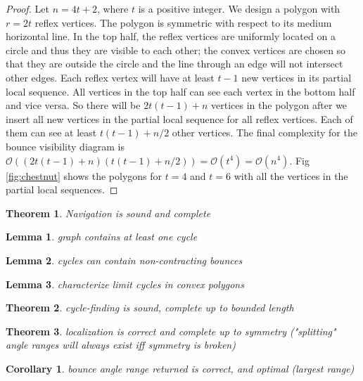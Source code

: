 \documentclass[]{article}  %
\newtheorem{theorem}{\bf Theorem}
\newtheorem{corollary}{\bf Corollary}
\newtheorem{lemma}{\bf Lemma}
\begin{document}
\begin{proof}
Let $n = 4t+2$, where $t$ is a positive integer. We design a polygon with
$r = 2t$ reflex vertices. The polygon is symmetric with respect to its medium
horizontal line. In the top half, the reflex vertices are uniformly located on a
circle and thus they are visible to each other; the convex vertices are chosen
so that they are outside the circle and the line through an edge will not
intersect other edges. Each reflex vertex will have at least $t-1$ new
vertices in its partial local sequence. All vertices in the top half can see
each vertex in the bottom half and vice versa. So there will be $2t(t-1)+n$
vertices in the polygon after we insert all new vertices in the partial local
sequence for all reflex vertices. Each of them can see at least $t(t-1)+n/2$
other vertices. The final complexity for the bounce visibility diagram is
$\mathcal{O} ((2t(t-1)+n)(t(t-1)+n/2)) = \mathcal{O}(t^4) = \mathcal{O}(n^4)$.
Fig \ref{fig:chestnut} shows the polygons for $t = 4$ and $t=6$ with all the
vertices in the partial local sequences. %

\end{proof}

\begin{theorem}
Navigation is sound and complete
\end{theorem}


\begin{lemma}
graph contains at least one cycle
\end{lemma}

\begin{lemma}
cycles can contain non-contracting bounces
\end{lemma}

\begin{lemma}
characterize limit cycles in convex polygons
\end{lemma}

\begin{theorem}
cycle-finding is sound, complete up to bounded length
\end{theorem}

\begin{theorem}
localization is correct and complete up to symmetry ("splitting" angle ranges
will always exist iff symmetry is broken)
\end{theorem}

\begin{corollary} bounce angle range returned is correct, and optimal
   (largest range)
\end{corollary}
\end{document}
